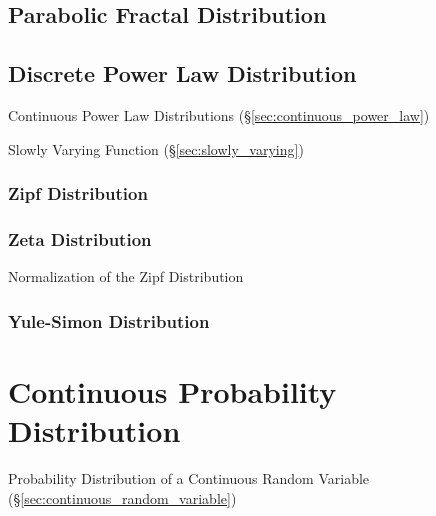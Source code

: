 \subsection{Parabolic Fractal Distribution}
\label{sec:parabolic_fractal_distribution}

\subsection{Discrete Power Law Distribution}\label{sec:discrete_power_law}

\fist Continuous Power Law Distributions (\S\ref{sec:continuous_power_law})

Slowly Varying Function (\S\ref{sec:slowly_varying})



\subsubsection{Zipf Distribution}\label{sec:zipf_distribution}

\subsubsection{Zeta Distribution}\label{sec:zeta_distribution}

Normalization of the Zipf Distribution



\subsubsection{Yule-Simon Distribution}\label{sec:yule_simon_distribution}



\section{Continuous Probability Distribution}\label{sec:continuous_probability}

Probability Distribution of a Continuous Random Variable
(\S\ref{sec:continuous_random_variable})

